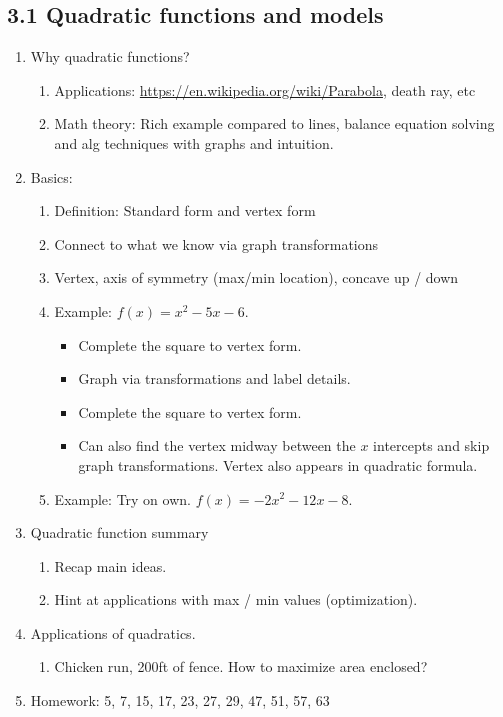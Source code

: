 \documentclass{article}
\begin{document}
\subsection{3.1 Quadratic functions and models}
\begin{enumerate}

\item Why quadratic functions?
\begin{enumerate}
\item Applications: \url{https://en.wikipedia.org/wiki/Parabola}, death ray, etc
\item Math theory: Rich example compared to lines, balance equation solving and alg techniques with graphs and intuition.
\end{enumerate}

\item Basics:
\begin{enumerate}
\item Definition: Standard form and vertex form
\item Connect to what we know via graph transformations
\item Vertex, axis of symmetry (max/min location), concave up / down
\item Example: $f(x) = x^2-5x-6$. 
\begin{itemize}
\item Complete the square to vertex form. 
\item Graph via transformations and label details.
\item Complete the square to vertex form.
\item Can also find the vertex midway between the $x$ intercepts and skip graph transformations. Vertex also appears in quadratic formula.
\end{itemize}
\item Example: Try on own. $f(x) = -2x^2-12x-8$.
\end{enumerate}

\item Quadratic function summary
\begin{enumerate}
\item Recap main ideas. 
\item Hint at applications with max / min values (optimization).
\end{enumerate}

\item Applications of quadratics.
\begin{enumerate}
\item Chicken run, 200ft of fence. How to maximize area enclosed?
\end{enumerate}

\item Homework: 5, 7, 15, 17, 23, 27, 29, 47, 51, 57, 63
\end{enumerate}
\end{document}
